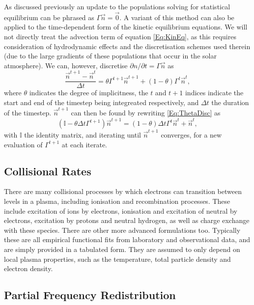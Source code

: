 As discussed previously an update to the populations solving for statistical equilibrium can be phrased as $\Gamma \vec{n} = \vec{0}$. A variant of this method can also be applied to the time-dependent form of the kinetic equilibrium equations. We will not directly treat the advection term of equation \eqref{Eq:KinEq}, as this requires consideration of hydrodynamic effects and the discretisation schemes used therein (due to the large gradients of these populations that occur in the solar atmosphere).
We can, however, discretise $\partial n / \partial t = \Gamma \vec{n}$ as
\begin{equation}
    \label{Eq:ThetaDisc}
    \frac{\vec{n}^{t+1} - \vec{n}^t}{\Delta t} = \theta \Gamma^{t+1} \vec{n}^{t+1} + (1-\theta)\Gamma^{t} \vec{n}^{t},
\end{equation}
where $\theta$ indicates the degree of implicitness, the $t$ and $t+1$ indices indicate the start and end of the timestep being integreated respectively, and $\Delta t$ the duration of the timestep.
$\vec{n}^{t+1}$ can then be found by rewriting \eqref{Eq:ThetaDisc} as
\begin{equation}
    \label{Eq:TimeDepSystem}
    (\mathbb{I} - \theta\Delta t \Gamma^{t+1}) \vec{n}^{t+1} = (1-\theta)\Delta t \Gamma^{t}\vec{n}^{t} + \vec{n}^{t},
\end{equation}
with $\mathbb{I}$ the identity matrix, and iterating until $\vec{n}^{t+1}$ converges, for a new evaluation of $\Gamma^{t+1}$ at each iterate.

\subsection{Collisional Rates}

There are many collisional processes by which electrons can transition between levels in a plasma, including ionisation and recombination processes. These include excitation of ions by electrons, ionisation and excitation of neutral by electrons, excitation by protons and neutral hydrogen, as well as charge exchange with these species. There are other more advanced formulations too. Typically these are all empirical functional fits from laboratory and observational data, and are simply provided in a tabulated form. They are assumed to only depend on local plasma properties, such as the temperature, total particle density and electron density.

\NeedRef{}

\subsection{Partial Frequency Redistribution}

